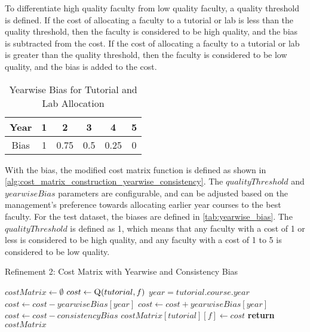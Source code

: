 To differentiate high quality faculty from low quality faculty, a quality threshold is defined. If the cost of allocating a faculty to a tutorial or lab is less than the quality threshold, then the faculty is considered to be high quality, and the bias is subtracted from the cost. If the cost of allocating a faculty to a tutorial or lab is greater than the quality threshold, then the faculty is considered to be low quality, and the bias is added to the cost.

\begin{table}[H]
  \centering
  \begin{tabular}{|c|c|c|c|c|c|}
    \hline
    Year & 1 & 2    & 3   & 4    & 5 \\ \hline
    Bias & 1 & 0.75 & 0.5 & 0.25 & 0 \\ \hline
  \end{tabular}
  \caption{Yearwise Bias for Tutorial and Lab Allocation}
  \label{tab:yearwise_bias}
\end{table}

With the bias, the modified cost matrix function is defined as shown in \autoref{alg:cost_matrix_construction_yearwise_consistency}. The $qualityThreshold$ and $yearwiseBias$ parameters are configurable, and can be adjusted based on the management's preference towards allocating earlier year courses to the best faculty. For the test dataset, the biases are defined in \autoref{tab:yearwise_bias}. The $qualityThreshold$ is defined as 1, which means that any faculty with a cost of 1 or less is considered to be high quality, and any faculty with a cost of 1 to 5 is considered to be low quality.


\begin{algorithm}[H]
  \caption*{Refinement 2: Cost Matrix with Yearwise and Consistency Bias}
  \begin{algorithmic}
    \State $costMatrix \gets \emptyset$
    \State $cost \gets \Call{Q}{tutorial, f}$
    \State $year = tutorial.course.year$
    \State $cost \gets cost - yearwiseBias[year]$
    \Else
    \State $cost \gets cost + yearwiseBias[year]$
    \EndIf
    \State $cost \gets cost - consistencyBias$
    \State $costMatrix[tutorial][f] \gets cost$
    \EndIf
    \EndFor
    \EndFor
    \State \textbf{return} $costMatrix$
    \EndProcedure
  \end{algorithmic}
\end{algorithm}

